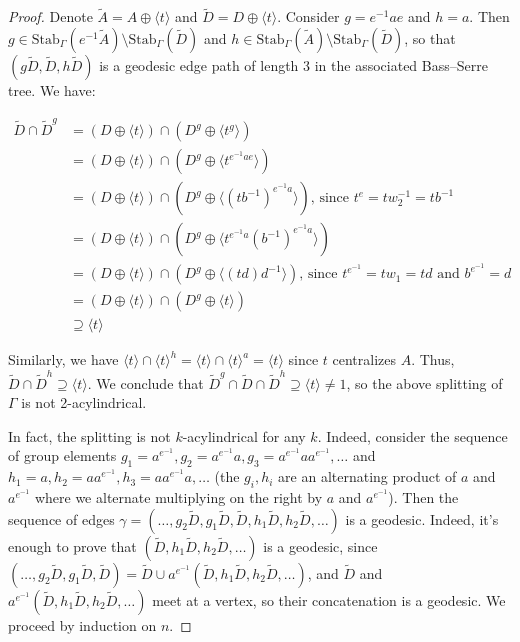\documentclass{amsart}
\theoremstyle{plain}
\theoremstyle{definition}
\theoremstyle{remark}
\begin{document}
\begin{proof}
    Denote $\tilde{A} = A \oplus \langle t \rangle$ and $\tilde{D} = D \oplus \langle t \rangle$. Consider $g = e^{-1}ae$ and $h = a$. Then $g \in \mathrm{Stab}_{\Gamma}(e^{-1}\tilde{A}) \setminus \mathrm{Stab}_{\Gamma}(\tilde{D})$ and $h \in \mathrm{Stab}_{\Gamma}(\tilde{A}) \setminus \mathrm{Stab}_{\Gamma}(\tilde{D})$, so that $(g\tilde{D}, \tilde{D}, h\tilde{D})$ is a geodesic edge path of length 3 in the associated Bass--Serre tree. We have: 

    \begin{align*}
        \tilde{D} \cap \tilde{D}^g &= (D \oplus \langle t \rangle) \cap (D^g \oplus \langle t^g \rangle) \\
        &= (D \oplus \langle t \rangle) \cap (D^g \oplus \langle t^{e^{-1}ae} \rangle) \\
        &= (D \oplus \langle t \rangle) \cap (D^g \oplus \langle (tb^{-1})^{e^{-1}a} \rangle) \text{, since $t^e = tw_2^{-1} = tb^{-1}$}\\
        &= (D \oplus \langle t \rangle) \cap (D^g \oplus \langle t^{e^{-1}a}(b^{-1})^{e^{-1}a} \rangle) \\
        &=(D \oplus \langle t \rangle) \cap (D^g \oplus \langle (td)d^{-1}\rangle) \text{, since $t^{e^{-1}} = tw_1 = td$ and $b^{e^{-1}} = d$} \\
        &= (D \oplus \langle t \rangle) \cap (D^g \oplus \langle t\rangle) \\
        &\supseteq \langle t \rangle 
    \end{align*}

    Similarly, we have $\langle t \rangle \cap \langle t \rangle^h = \langle t \rangle \cap \langle t \rangle^a = \langle t \rangle$ since $t$ centralizes $A$. Thus, $\tilde{D} \cap \tilde{D}^h \supseteq \langle t \rangle$. We conclude that $\tilde{D}^g \cap \tilde{D} \cap \tilde{D}^h \supseteq \langle t \rangle \neq 1$, so the above splitting of $\Gamma$ is not 2-acylindrical. 

    In fact, the splitting is not $k$-acylindrical for any $k$. Indeed, consider the sequence of group elements $g_1 = a^{e^{-1}}, g_2 = a^{e^{-1}}a, g_3 = a^{e^{-1}}aa^{e^{-1}}, \ldots$ and $h_1 = a, h_2 = aa^{e^{-1}}, h_3=aa^{e^{-1}}a, \ldots$ (the $g_i,h_i$ are an alternating product of $a$ and $a^{e^{-1}}$ where we alternate multiplying on the right by $a$ and $a^{e^{-1}}$). Then the sequence of edges $\gamma = (\ldots,g_2 \tilde{D}, g_1 \tilde{D}, \tilde{D}, h_1 \tilde{D}, h_2 \tilde{D}, \ldots)$ is a geodesic. Indeed, it's enough to prove that $(\tilde{D}, h_1 \tilde{D}, h_2 \tilde{D}, \ldots)$ is a geodesic, since $(\ldots,g_2 \tilde{D}, g_1 \tilde{D}, \tilde{D}) = \tilde{D} \cup a^{e^{-1}}(\tilde{D}, h_1 \tilde{D}, h_2 \tilde{D}, \ldots)$, and $\tilde{D}$ and $a^{e^{-1}}(\tilde{D}, h_1 \tilde{D}, h_2 \tilde{D}, \ldots)$ meet at a vertex, so their concatenation is a geodesic. We proceed by induction on $n$. 


\end{proof}
\end{document}
